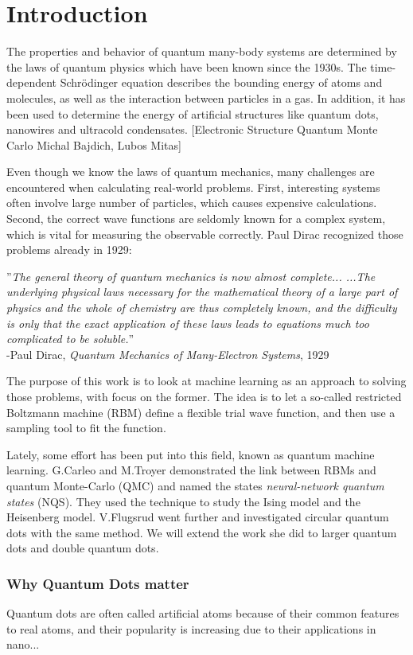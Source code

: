 \chapter{Introduction}
The properties and behavior of quantum many-body systems are determined by the laws of quantum physics which have been known since the 1930s. The time-dependent Schrödinger equation describes the bounding energy of atoms and molecules, as well as the interaction between particles in a gas. In addition, it has been used to determine the energy of artificial structures like quantum dots, nanowires and ultracold condensates. [Electronic Structure Quantum Monte Carlo Michal Bajdich, Lubos Mitas] 

Even though we know the laws of quantum mechanics, many challenges are encountered when calculating real-world problems. First, interesting systems often involve large number of particles, which causes expensive calculations. Second, the correct wave functions are seldomly known for a complex system, which is vital for measuring the observable correctly. Paul Dirac recognized those problems already in 1929: \bigskip


''\textit{The general theory of quantum mechanics is now almost complete... ...The underlying physical laws necessary for the mathematical theory of a large part of physics and the whole of chemistry are thus completely known, and the difficulty is only that the exact application of these laws leads to equations much too complicated to be soluble.}''\\ 
-Paul Dirac, \textit{Quantum Mechanics of Many-Electron Systems}, 1929 \bigskip

The purpose of this work is to look at machine learning as an approach to solving those problems, with focus on the former. The idea is to let a so-called restricted Boltzmann machine (RBM) define a flexible trial wave function, and then use a sampling tool to fit the function.

Lately, some effort has been put into this field, known as quantum machine learning. G.Carleo and M.Troyer demonstrated the link between RBMs and quantum Monte-Carlo (QMC) and named the states \textit{neural-network quantum states} (NQS). They used the technique to study the Ising model and the Heisenberg model. \cite{carleo_solving_2017} V.Flugsrud went further and investigated circular quantum dots with the same method. We will extend the work she did to larger quantum dots and double quantum dots.

\subsection*{Why Quantum Dots matter}
Quantum dots are often called artificial atoms because of their common features to real atoms, and their popularity is increasing due to their applications in nano...

